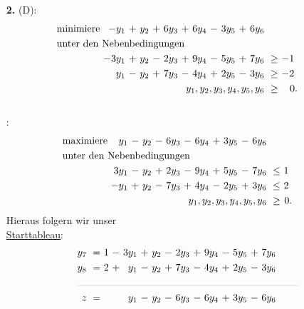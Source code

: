 \documentclass [a4paper,11pt]{article}
\begin{document}
\begin{enumerate}
\begin{enumerate}
\begin{enumerate}
            \end{enumerate}
        \end{enumerate}
        \item[\textbf{2.}]
            (D):
            \begin{align*}
            \begin{alignedat}{12}
            & \text{minimiere } & -y_1 &\ + &\ y_2 &\ + &\ 6y_3 &\ + &\ 6y_4 &\ - &\ 3y_5 &\ + &\ 6y_6 & & \\
            & \rlap{unter den Nebenbedingungen} & & & & & & & & & & & & & \\
            && -3y_1 &\ + &\ y_2 &\ - &\ 2y_3 &\ + &\ 9y_4 &\ - &\ 5y_5 &\ + &\ 7y_6 &\ \geq &\ -1\ \\
            &&   y_1 &\ - &\ y_2 &\ + &\ 7y_3 &\ - &\ 4y_4 &\ + &\ 2y_5 &\ - &\ 3y_6 &\ \geq &\ -2\ \\
            && & & & & & & & & & & \llap{$y_1,y_2,y_3,y_4,y_5,y_6$} &\ \geq &\ 0.
            \end{alignedat}
            \end{align*}\\

            \tilD:
            \begin{align*}
            \begin{alignedat}{12}
            & \text{maximiere } & y_1 &\ - &\ y_2 &\ - &\ 6y_3 &\ - &\ 6y_4 &\ + &\ 3y_5 &\ - &\ 6y_6 & & \\
            & \rlap{unter den Nebenbedingungen} & & & & & & & & & & & & & \\
            && 3y_1 &\ - &\ y_2 &\ + &\ 2y_3 &\ - &\ 9y_4 &\ + &\ 5y_5 &\ - &\ 7y_6 &\ \leq &\ 1\ \\
            && -y_1 &\ + &\ y_2 &\ - &\ 7y_3 &\ + &\ 4y_4 &\ - &\ 2y_5 &\ + &\ 3y_6 &\ \leq &\ 2\ \\
            && & & & & & & & & & & \llap{$y_1,y_2,y_3,y_4,y_5,y_6$} &\ \geq &\ 0.
            \end{alignedat}
            \end{align*}
            \newpage
            Hieraus folgern wir unser\\
            \underline{Starttableau}:
            \begin{align*}
            \begin{alignedat}{12}
            && y_7 &\ = &\ 1 &\ - &\ 3y_1 &\ + &\ y_2 &\ - &\ 2y_3 &\ + &\ 9y_4 &\ - &\ 5y_5 &\ + &\ 7y_6 \\
            && y_8 &\ = &\ 2 &\ + &\  y_1 &\ - &\ y_2 &\ + &\ 7y_3 &\ - &\ 4y_4 &\ + &\ 2y_5 &\ - &\ 3y_6 \\
            &\rlap{\rule{7.8cm}{.1pt}} &&&&&&&&&&&&&&&\\
            && z   &\ = &    &    &\  y_1 &\ - &\ y_2 &\ - &\ 6y_3 &\ - &\ 6y_4 &\ + &\ 3y_5 &\ - &\ 6y_6 
            \end{alignedat}
            \end{align*}


\end{enumerate}
\end{document}
